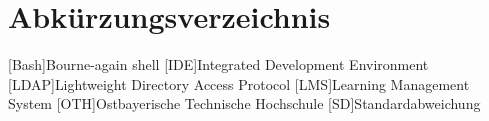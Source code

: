 \section*{Abkürzungsverzeichnis}

\begin{acronym}[Bash]
    [Bash]{Bourne-again shell}
    [IDE]{Integrated Development Environment}
    [LDAP]{Lightweight Directory Access Protocol}
    [LMS]{Learning Management System}
    [OTH]{Ostbayerische Technische Hochschule}
    [SD]{Standardabweichung}
\end{acronym}